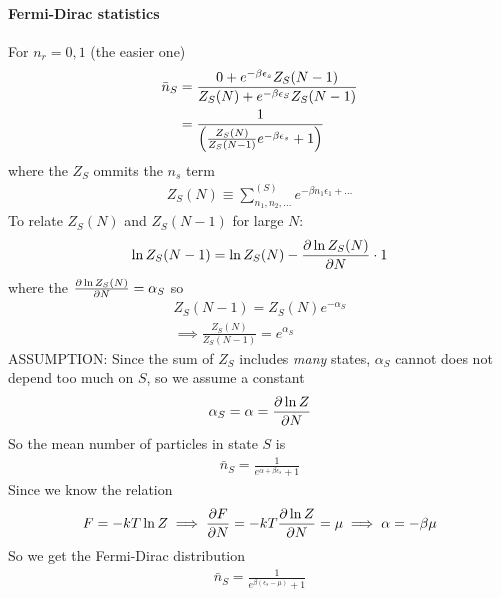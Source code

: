 \documentclass[../main.tex]{subfiles}
\begin{document}
\paragraph{Fermi-Dirac statistics} For $n_r = 0, 1$ (the easier one)
\begin{align*}
    \bar n_S &= \frac{
        0 + e^{-\beta \epsilon_s} Z_S (N - 1)
    }
    {
        Z_S (N) + e^{-\beta \epsilon_S} Z_S (N - 1)
    } \\
    &= \frac{1}{
        \qt(
            \frac{Z_S (N)}{Z_S (N - 1)} e^{-\beta \epsilon_s} + 1
        )
    }
\end{align*}
where the $Z_S$ ommits the $n_s$ term
\begin{align*}
    Z_S (N) \equiv \sum_{n_1, n_2, \dots}^{(S)} e^{-\beta n_1 \epsilon_1 + \dots}
\end{align*}
To relate $Z_S (N)$ and $Z_S (N - 1)$ for large $N$:
\begin{align*}
    \ln Z_S (N-1) = \ln Z_S (N) - \pdv{\ln Z_S (N)}{N} \cdot 1
\end{align*}
where the $\pdv{\ln Z_S (N)}{N} = \alpha_S$ so
\begin{gather*}
    Z_S (N - 1) = Z_S (N) e^{-\alpha_S} \\
    \implies \frac{Z_S (N)}{Z_S (N - 1)} = e^{\alpha_S}
\end{gather*}
ASSUMPTION: Since the sum of $Z_S$ includes \emph{many} states,
$\alpha_S$ cannot does not depend too much on $S$, so we assume a constant
\begin{align*}
    \alpha_S = \alpha = \pdv{\ln Z}{N}
\end{align*}
So the mean number of particles in state $S$ is
\begin{align*}
    \bar n_S = \frac{1}{e^{\alpha + \beta \epsilon_s} + 1}
\end{align*}
Since we know the relation
\begin{align*}
    F = -kT \ln Z \implies \pdv{F}{N} = -kT \pdv{\ln Z}{N} = \mu \implies \alpha = -\beta \mu
\end{align*}
So we get the Fermi-Dirac distribution
\begin{align*}
    \bar n_S = \frac{1}{e^{\beta (\epsilon_s - \mu)} + 1}
\end{align*}
\end{document}
